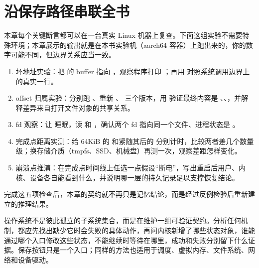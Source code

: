 \section{沿保存路径串联全书}

本章每个关键断言都可以在一台真实 Linux 机器上复查。下面这组实验不需要特殊环境；本章展示的输出就是在本书实验机（aarch64 容器）上跑出来的，你的数字可能不同，但边界关系应当一致。

\begin{enumerate}
\tightlist
\item 坏地址实验：把  的 buffer 指向 ，观察程序打印 ；再用  对照系统调用边界上的真实一行。
\item offset 归属实验：分别跑 、重新 、 三个版本，用  验证最终内容是 、、，并解释差异来自打开文件对象的共享关系。
\item fd 观察：让  睡眠，读  和 ，确认两个 fd 指向同一个文件、进程状态是 。
\item 完成点距离实测：给 64KiB 的  和紧随其后的  分别计时，比较两者差几个数量级；换存储介质（tmpfs、SSD、机械盘）再测一次，观察差距怎样变化。
\item 崩溃点推演：在完成点时间线上任选一点假设“断电”，写出重启后用户、内核、设备各自能看到什么，并说明哪一层的持久记录足以支撑恢复结论。
\end{enumerate}

完成这五项检查后，本章的契约就不再只是记忆结论，而是经过反例检验后重新建立的推理结果。

操作系统不是彼此孤立的子系统集合，而是在维护一组可验证契约。分析任何机制，都应先找出缺少它时会失败的具体动作，再问内核新增了哪些状态对象，谁能通过哪个入口修改这些状态，不能继续时等待在哪里，成功和失败分别留下什么证据。保存按钮只是一个入口；同样的方法也适用于调度、虚拟内存、文件系统、网络和设备驱动。
